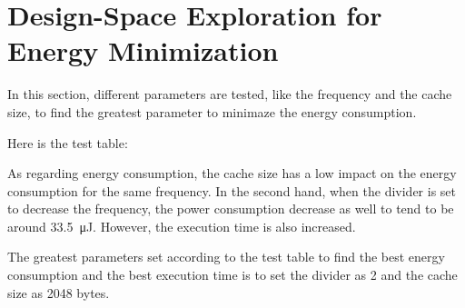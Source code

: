\section{Design-Space Exploration for Energy Minimization}

In this section, different parameters are tested, like the frequency and the cache size, to find the greatest parameter to minimaze the energy consumption. 

Here is the test table:


As regarding energy consumption, the cache size has a low impact on the energy consumption for the same frequency.
In the second hand, when the divider is set to decrease the frequency, the power consumption decrease as well to tend to be around \SI{33.5}{\micro\joule}. However, the execution time is also increased. 

The greatest parameters set according to the test table to find the best energy consumption and the best execution time is to set the divider as 2 and the cache size as 2048 bytes.
